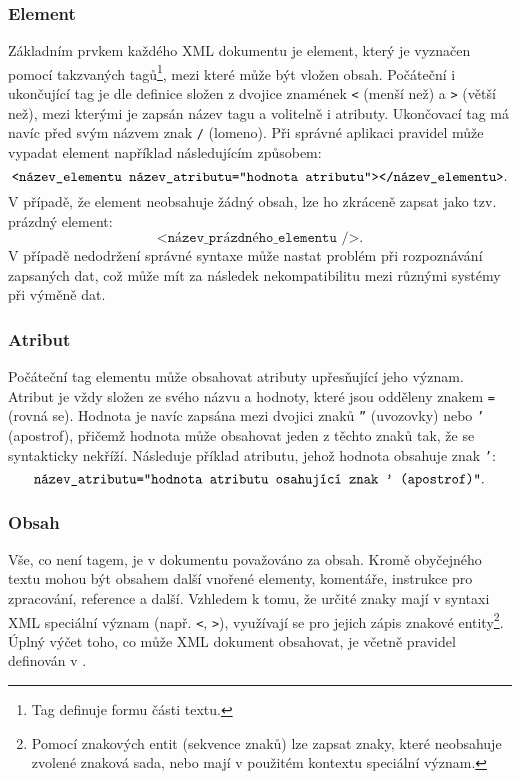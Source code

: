 \subsubsection{Element}
Základním prvkem každého XML dokumentu je element, který je vyznačen pomocí takzvaných tagů\footnote{Tag definuje formu části textu.}, mezi které může být vložen obsah. Počáteční i ukončující tag je dle definice \cite{w3cxml} složen z dvojice znamének \texttt{<} (menší než) a \texttt{>} (větší než), mezi kterými je zapsán název tagu a volitelně i atributy. Ukončovací tag má navíc před svým názvem znak \texttt{/} (lomeno). Při správné aplikaci pravidel může vypadat element například následujícím způsobem:
$$\texttt{<název\_elementu název\_atributu=\textquotedblright hodnota atributu\textquotedblright></název\_elementu>}.$$
V případě, že element neobsahuje žádný obsah, lze ho zkráceně zapsat jako tzv. prázdný element:
$$\texttt{<název\_prázdného\_elementu />}.$$
V případě nedodržení správné syntaxe může nastat problém při rozpoznávání zapsaných dat, což může mít za následek nekompatibilitu mezi různými systémy při výměně dat.

\subsubsection{Atribut}
Počáteční tag elementu může obsahovat atributy upřesňující jeho význam. Atribut je vždy složen ze svého názvu a hodnoty, které jsou odděleny znakem \texttt{=} (rovná se). Hodnota je navíc zapsána mezi dvojici znaků \texttt{\textquotedblright} (uvozovky) nebo \texttt{\textquoteright} (apostrof), přičemž hodnota může obsahovat jeden z těchto znaků tak, že se syntakticky nekříží. Následuje příklad atributu, jehož hodnota obsahuje znak \texttt{\textquoteright}:
$$\texttt{název\_atributu=\textquotedblright hodnota atributu osahující znak \textquoteright\ (apostrof)\textquotedblright}.$$

\subsubsection{Obsah}
Vše, co není tagem, je v dokumentu považováno za obsah. Kromě obyčejného textu mohou být obsahem další vnořené elementy, komentáře, instrukce pro zpracování, reference a další. Vzhledem k tomu, že určité znaky mají v syntaxi XML speciální význam (např. \texttt{<}, \texttt{>}), využívají se pro jejich zápis znakové entity\footnote{Pomocí znakových entit (sekvence znaků) lze zapsat znaky, které neobsahuje zvolené znaková sada, nebo mají v použitém kontextu speciální význam.}. Úplný výčet toho, co může XML dokument obsahovat, je včetně pravidel definován v \cite{w3cxml}.

